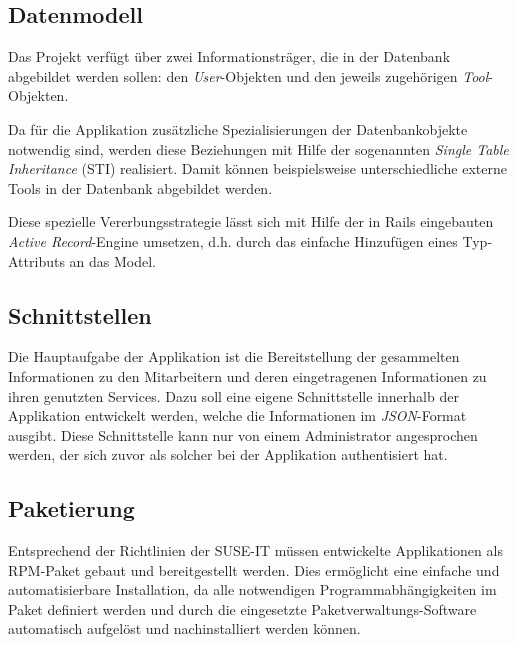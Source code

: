 \subsection{Datenmodell}
\label{sec:Datenmodell}
Das Projekt verfügt über zwei Informationsträger, die in der Datenbank abgebildet werden
sollen: den \textit{User}-Objekten und den jeweils zugehörigen \textit{Tool}-Objekten.


Da für die Applikation zusätzliche Spezialisierungen der Datenbankobjekte notwendig sind, werden
diese Beziehungen mit Hilfe der sogenannten \textit{Single Table Inheritance} (\acs{STI}) realisiert.
Damit können beispielsweise unterschiedliche externe Tools in der Datenbank abgebildet werden.


Diese spezielle Vererbungsstrategie lässt sich mit Hilfe der in Rails eingebauten
\textit{Active Record}-Engine umsetzen, d.h. durch das einfache Hinzufügen eines Typ-Attributs an das Model.

\subsection{Schnittstellen}
\label{sec:Schnittstellen}
Die Hauptaufgabe der Applikation ist die Bereitstellung der gesammelten Informationen zu den
Mitarbeitern und deren eingetragenen Informationen zu ihren genutzten Services. Dazu soll eine
eigene Schnittstelle innerhalb der Applikation entwickelt werden, welche die Informationen im
\textit{JSON}-Format ausgibt. Diese Schnittstelle kann nur von einem Administrator angesprochen
werden, der sich zuvor als solcher bei der Applikation authentisiert hat.


\subsection{Paketierung}
\label{sec:Paketierung}

Entsprechend der Richtlinien der SUSE-IT müssen entwickelte
Applikationen als \acs{RPM}-Paket gebaut und bereitgestellt werden. Dies
ermöglicht eine einfache und automatisierbare Installation, da alle
notwendigen Programmabhängigkeiten im Paket definiert werden und durch
die eingesetzte Paketverwaltungs-Software automatisch aufgelöst und
nachinstalliert werden können.
%
